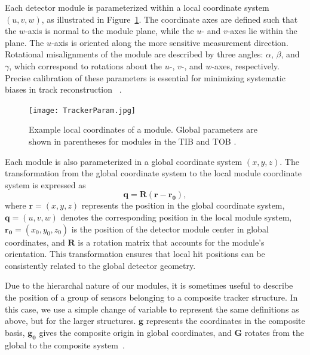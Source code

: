 Each detector module is parameterized within a local coordinate system $(u, v, w)$, as illustrated in Figure~\ref{fig:TrackerParam}. The coordinate axes are defined such that the $w$-axis is normal to the module plane, while the $u$- and $v$-axes lie within the plane. The $u$-axis is oriented along the more sensitive measurement direction. Rotational misalignments of the module are described by three angles: $\alpha$, $\beta$, and $\gamma$, which correspond to rotations about the $u$-, $v$-, and $w$-axes, respectively. Precise calibration of these parameters is essential for minimizing systematic biases in track reconstruction ~\cite{Karimaki:926537, Karimaki:2003bd}.

\begin{figure}[!hbt]
    \begin{center}
        \texttt{[image: TrackerParam.jpg]}
        \caption{Example local coordinates of a module. Global parameters are shown in parentheses for modules in the TIB and TOB \cite{WAdam_2009}.}
        \label{fig:TrackerParam}
    \end{center}
\end{figure}

Each module is also parameterized in a global coordinate system $(x, y, z)$. The transformation from the global coordinate system to the local module coordinate system is expressed as
\begin{equation}
    \mathbf{q} = \mathbf{R} (\mathbf{r} - \mathbf{r_0}),
\end{equation}  
where $\mathbf{r} = (x,y,z)$ represents the position in the global coordinate system, $\mathbf{q} = (u,v,w)$ denotes the corresponding position in the local module system, $\mathbf{r_0} = (x_0,y_0,z_0)$ is the position of the detector module center in global coordinates, and $\mathbf{R}$ is a rotation matrix that accounts for the module's orientation. This transformation ensures that local hit positions can be consistently related to the global detector geometry. 

Due to the hierarchal nature of our modules, it is sometimes useful to describe the position of a group of sensors belonging to a composite tracker structure. In this case, we use a simple change of variable to represent the same definitions as above, but for the larger structures. $\mathbf{g}$ represents the coordinates in the composite basis, $\mathbf{g_0}$ gives the composite origin in global coordinates, and $\mathbf{G}$ rotates from the global to the composite system~\cite{Karimaki:926537}.

